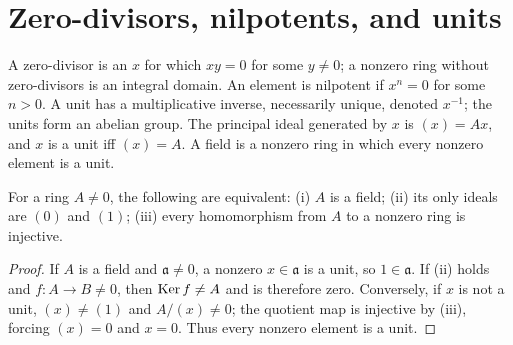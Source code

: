 \section{Zero-divisors, nilpotents, and units}
\label{am-ch1-elementary}
\begin{definition}
\label{am-def-domain-nil-unit}
\uses{}
A zero-divisor is an $x$ for which $xy=0$ for some $y\ne0$; a nonzero ring
without zero-divisors is an integral domain.  An element is nilpotent if
$x^n=0$ for some $n>0$.  A unit has a multiplicative inverse, necessarily
unique, denoted $x^{-1}$; the units form an abelian group.  The principal ideal
generated by $x$ is $(x)=Ax$, and $x$ is a unit iff $(x)=A$.  A field is a
nonzero ring in which every nonzero element is a unit.
\end{definition}
\begin{proposition}
\label{am-prop-1-2}
\uses{}
For a ring $A\ne0$, the following are equivalent: (i) $A$ is a field; (ii) its
only ideals are $(0)$ and $(1)$; (iii) every homomorphism from $A$ to a nonzero
ring is injective.
\end{proposition}
\begin{proof}
If $A$ is a field and $\mathfrak{a}\ne0$, a nonzero $x\in\mathfrak{a}$ is a unit, so
$1\in\mathfrak{a}$.  If (ii) holds and $f:A\to B\ne0$, then $\operatorname{Ker} f\ne A$ and is
therefore zero.  Conversely, if $x$ is not a unit, $(x)\ne(1)$ and
$A/(x)\ne0$; the quotient map is injective by (iii), forcing $(x)=0$ and
$x=0$.  Thus every nonzero element is a unit.
\end{proof}

